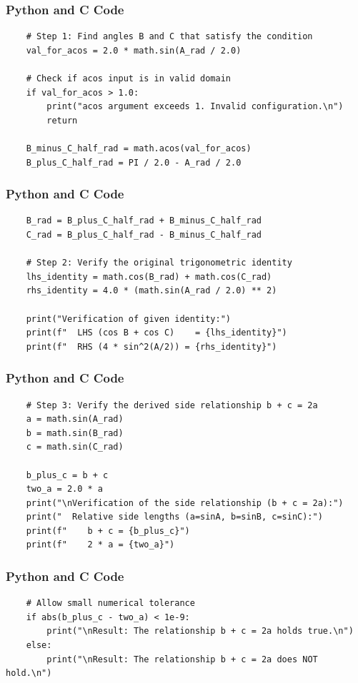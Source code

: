 \documentclass{beamer}
\begin{document}
\begin{frame}[fragile]
\frametitle{Python and C Code}
\begin{lstlisting}
    # Step 1: Find angles B and C that satisfy the condition
    val_for_acos = 2.0 * math.sin(A_rad / 2.0)

    # Check if acos input is in valid domain
    if val_for_acos > 1.0:
        print("acos argument exceeds 1. Invalid configuration.\n")
        return

    B_minus_C_half_rad = math.acos(val_for_acos)
    B_plus_C_half_rad = PI / 2.0 - A_rad / 2.0
\end{lstlisting}
\end{frame}

\begin{frame}[fragile]
\frametitle{Python and C Code}
\begin{lstlisting}
    B_rad = B_plus_C_half_rad + B_minus_C_half_rad
    C_rad = B_plus_C_half_rad - B_minus_C_half_rad

    # Step 2: Verify the original trigonometric identity
    lhs_identity = math.cos(B_rad) + math.cos(C_rad)
    rhs_identity = 4.0 * (math.sin(A_rad / 2.0) ** 2)

    print("Verification of given identity:")
    print(f"  LHS (cos B + cos C)    = {lhs_identity}")
    print(f"  RHS (4 * sin^2(A/2)) = {rhs_identity}")
\end{lstlisting}
\end{frame}

\begin{frame}[fragile]
\frametitle{Python and C Code}
\begin{lstlisting}
    # Step 3: Verify the derived side relationship b + c = 2a
    a = math.sin(A_rad)
    b = math.sin(B_rad)
    c = math.sin(C_rad)

    b_plus_c = b + c
    two_a = 2.0 * a
    print("\nVerification of the side relationship (b + c = 2a):")
    print("  Relative side lengths (a=sinA, b=sinB, c=sinC):")
    print(f"    b + c = {b_plus_c}")
    print(f"    2 * a = {two_a}")
\end{lstlisting}
\end{frame}

\begin{frame}[fragile]
\frametitle{Python and C Code}
\begin{lstlisting}
    # Allow small numerical tolerance
    if abs(b_plus_c - two_a) < 1e-9:
        print("\nResult: The relationship b + c = 2a holds true.\n")
    else:
        print("\nResult: The relationship b + c = 2a does NOT hold.\n")
\end{lstlisting}
\end{frame}
\end{document}
